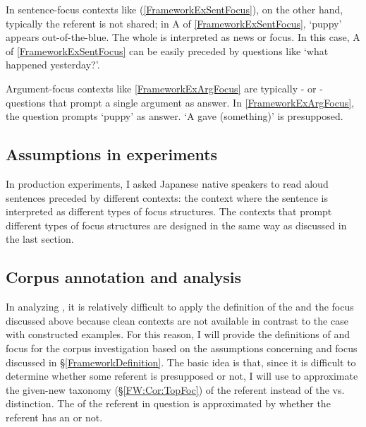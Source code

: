 In sentence-focus contexts like (\ref{FrameworkExSentFocus}),
on the other hand,
typically the referent is not shared;
in A of \ref{FrameworkExSentFocus},
 `puppy' appears out-of-the-blue.
The whole  is interpreted as news or focus.
In this case, A of \ref{FrameworkExSentFocus} can be easily preceded by
questions like `what happened yesterday?'.

Argument-focus contexts like \ref{FrameworkExArgFocus}
are typically - or -questions
that prompt a single argument as answer.
In \ref{FrameworkExArgFocus},
the question prompts  `puppy' as answer.
`A gave (something)' is presupposed.


\subsection{Assumptions in experiments}

In production experiments,
I asked Japanese native speakers to read aloud sentences preceded by different contexts:
the context where the sentence is interpreted as different types of focus structures.
The contexts that prompt different types of focus structures
are designed in the same way as discussed in the last section.

\subsection{Corpus annotation and analysis}\label{FrameworkCorpus}

In analyzing ,
it is relatively difficult to apply the definition of the  and the focus discussed above
because clean contexts are not available in contrast to the case with constructed examples.
For this reason,
I will provide the definitions of  and focus for the corpus investigation
based on the assumptions concerning  and focus discussed in \S \ref{FrameworkDefinition}.
The basic idea is that, since it is difficult to determine
whether some  referent is presupposed or not,
I will use  to approximate the given-new taxonomy (\S \ref{FW:Cor:TopFoc})
of the referent
instead of the  vs.\  distinction.
The  of the referent in question is approximated
by whether the referent has an  or not.

